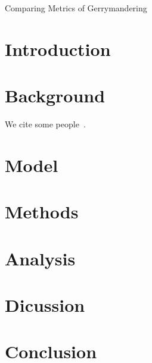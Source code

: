 \documentclass[12pt]{article}
\begin{document}
  \begin{center}
    \LARGE Comparing Metrics of Gerrymandering
    \vspace{-0.5em}
  \end{center}
  \nocite{*}
  \doublespacing{}

  \section{Introduction}
  
  \section{Background}

  We cite some people~\cite{chenrodden}.
  
  \section{Model}

  \section{Methods}

  \section{Analysis}

  \section{Dicussion}

  \section{Conclusion}
  
  \singlespacing{}

  \printbibliography{}
\end{document}

